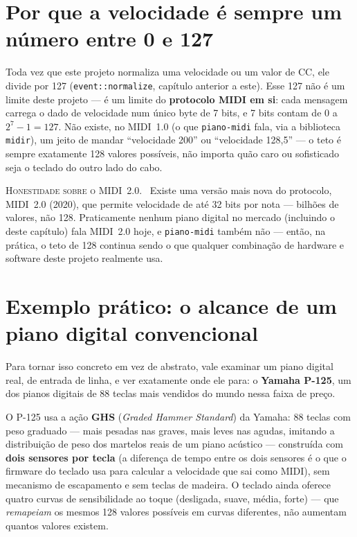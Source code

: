 \documentclass[11pt,oneside]{book}
\newcommand{\nova}[1]{\textsc{\color{accent}#1.}~}
\begin{document}
\section*{Por que a velocidade é sempre um número entre 0 e 127}

Toda vez que este projeto normaliza uma velocidade ou um valor de CC, ele
divide por 127 (\texttt{event::normalize}, capítulo anterior a este). Esse
127 não é um limite deste projeto --- é um limite do \textbf{protocolo
MIDI em si}: cada mensagem carrega o dado de velocidade num único byte de
7 bits, e 7 bits contam de $0$ a $2^7 - 1 = 127$. Não existe, no MIDI~1.0
(o que \texttt{piano-midi} fala, via a biblioteca \texttt{midir}), um jeito
de mandar \enquote{velocidade 200} ou \enquote{velocidade 128,5} --- o teto
é sempre exatamente 128 valores possíveis, não importa quão caro ou
sofisticado seja o teclado do outro lado do cabo.

\begin{newword}
\nova{Honestidade sobre o MIDI~2.0} Existe uma versão mais nova do
protocolo, MIDI~2.0 (2020), que permite velocidade de até 32 bits por nota
--- bilhões de valores, não 128. Praticamente nenhum piano digital no
mercado (incluindo o deste capítulo) fala MIDI~2.0 hoje, e
\texttt{piano-midi} também não --- então, na prática, o teto de 128
continua sendo o que qualquer combinação de hardware e software deste
projeto realmente usa.
\end{newword}

\section*{Exemplo prático: o alcance de um piano digital convencional}

Para tornar isso concreto em vez de abstrato, vale examinar um piano
digital real, de entrada de linha, e ver exatamente onde ele para: o
\textbf{Yamaha P-125}, um dos pianos digitais de 88 teclas mais vendidos
do mundo nessa faixa de preço.

O P-125 usa a ação \textbf{GHS} (\emph{Graded Hammer Standard}) da Yamaha:
88 teclas com peso graduado --- mais pesadas nas graves, mais leves nas
agudas, imitando a distribuição de peso dos martelos reais de um piano
acústico --- construída com \textbf{dois sensores por tecla} (a diferença
de tempo entre os dois sensores é o que o firmware do teclado usa para
calcular a velocidade que sai como MIDI), sem mecanismo de escapamento e
sem teclas de madeira. O teclado ainda oferece quatro curvas de
sensibilidade ao toque (desligada, suave, média, forte) --- que
\emph{remapeiam} os mesmos 128 valores possíveis em curvas diferentes, não
aumentam quantos valores existem.
\end{document}
